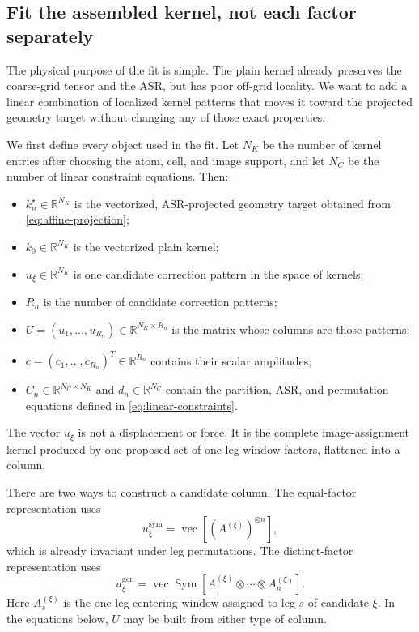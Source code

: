 \documentclass{article}
\begin{document}
\subsection{Fit the assembled kernel, not each factor separately}
\label{sec:constrained-cp}

The physical purpose of the fit is simple. The plain kernel already
preserves the coarse-grid tensor and the ASR, but has poor off-grid
locality. We want to add a linear combination of localized kernel patterns
that moves it toward the projected geometry target without changing any of
those exact properties.

We first define every object used in the fit. Let $N_K$ be the number of
kernel entries after choosing the atom, cell, and image support, and let
$N_C$ be the number of linear constraint equations. Then:
\begin{itemize}
    \item $k_n^\star\in\mathbb R^{N_K}$ is the vectorized, ASR-projected
    geometry target obtained from \autoref{eq:affine-projection};
    \item $k_0\in\mathbb R^{N_K}$ is the vectorized plain kernel;
    \item $u_\xi\in\mathbb R^{N_K}$ is one candidate correction pattern in
    the space of kernels;
    \item $R_n$ is the number of candidate correction patterns;
    \item $U=(u_1,\ldots,u_{R_n})\in\mathbb R^{N_K\times R_n}$ is the
    matrix whose columns are those patterns;
    \item $c=(c_1,\ldots,c_{R_n})^T\in\mathbb R^{R_n}$ contains their
    scalar amplitudes;
    \item $C_n\in\mathbb R^{N_C\times N_K}$ and
    $d_n\in\mathbb R^{N_C}$ contain the partition, ASR, and permutation
    equations defined in \autoref{eq:linear-constraints}.
\end{itemize}
The vector $u_\xi$ is not a displacement or force. It is the complete
image-assignment kernel produced by one proposed set of one-leg window
factors, flattened into a column.

There are two ways to construct a candidate column. The equal-factor
representation uses
\begin{equation}
    u_\xi^{\mathrm{sym}}
    =
    \operatorname{vec}
    [(A^{(\xi)})^{\otimes n}],
    \label{eq:symmetric-candidate-columns}
\end{equation}
which is already invariant under leg permutations. The distinct-factor
representation uses
\begin{equation}
    u_\xi^{\mathrm{gen}}
    =
    \operatorname{vec}
    \operatorname{Sym}
    [A_1^{(\xi)}\otimes\cdots\otimes A_n^{(\xi)}].
    \label{eq:candidate-columns}
\end{equation}
Here $A_s^{(\xi)}$ is the one-leg centering window assigned to leg $s$ of
candidate $\xi$. In the equations below, $U$ may be built from either type
of column.
\end{document}
